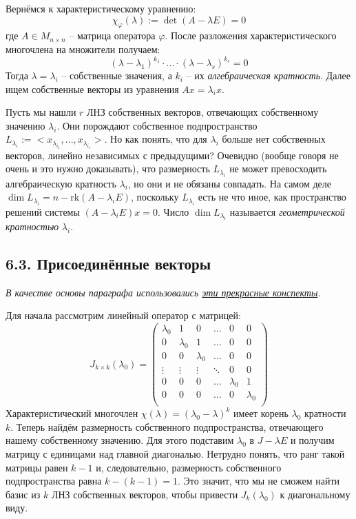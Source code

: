 \documentclass[a4paper, 12pt]{article}
\begin{document}
\begin{spacing}{1.5}
Вернёмся к характеристическому уравнению:
$$\chi_{\varphi}(\lambda) := \det (A - \lambda E) = 0$$
где $A \in M_{n \times n}$ -- матрица оператора $\varphi$. После разложения характеристического многочлена на множители получаем:
$$(\lambda - \lambda_1)^{k_1} \cdot ... \cdot (\lambda - \lambda_s)^{k_s} = 0$$
Тогда $\lambda = \lambda_i$ -- собственные значения, а $k_i$ -- их \textit{алгебраическая кратность}. Далее ищем собственные векторы из уравнения $Ax = \lambda_i x$.

Пусть мы нашли $r$ ЛНЗ собственных векторов, отвечающих собственному значению $\lambda_i$. Они порождают собственное подпространство $L_{\lambda_i} := < x_{\lambda_{i_1}}, ..., x_{\lambda_{i_r}} >$. Но как понять, что для $\lambda_i$ больше нет собственных векторов, линейно независимых с предыдущими? Очевидно (вообще говоря не очень и это нужно доказывать), что размерность $L_{\lambda_i}$ не может превосходить алгебраическую кратность $\lambda_i$, но они и не обязаны совпадать. На самом деле $\dim L_{\lambda_i} = n - \text{rk} (A - \lambda_i E)$, поскольку $L_{\lambda_i}$ есть не что иное, как пространство решений системы $(A - \lambda_i E)x = 0$. Число $\dim L_{\lambda_i}$ называется \textit{геометрической кратностью} $\lambda_i$.


\subsection*{6.3. Присоединённые векторы}

\textit{В качестве основы параграфа использовались \href{http://math.phys.msu.ru/archive/2017_2018/25/JF.pdf}{эти прекрасные конспекты}}.

Для начала рассмотрим линейный оператор с матрицей:
$$J_{k \times k} (\lambda_0) =
\begin{pmatrix}
\lambda_0 & 1 & 0 & \ldots & 0 & 0 \\
0 & \lambda_0 & 1 & \ldots & 0 & 0 \\
0 & 0 & \lambda_0 & \ldots & 0 & 0 \\
\vdots & \vdots & \vdots & \ddots & 0 & 0 \\
0 & 0 & 0 & \ldots & \lambda_0 & 1 \\
0 & 0 & 0 & \ldots & 0 & \lambda_0 \\
\end{pmatrix}
$$
Характеристический многочлен $\chi(\lambda) = (\lambda_0 - \lambda)^k$ имеет корень $\lambda_0$ кратности $k$. Теперь найдём размерность собственного подпространства, отвечающего нашему собственному значению. Для этого подставим $\lambda_0$ в $J - \lambda E$ и получим матрицу с единицами над главной диагональю. Нетрудно понять, что ранг такой матрицы равен $k - 1$ и, следовательно, размерность собственного подпространства равна $k - (k-1) = 1$. Это значит, что мы не сможем найти базис из $k$ ЛНЗ собственных векторов, чтобы привести $J_k (\lambda_0)$ к диагональному виду.


\end{spacing}
\end{document}
